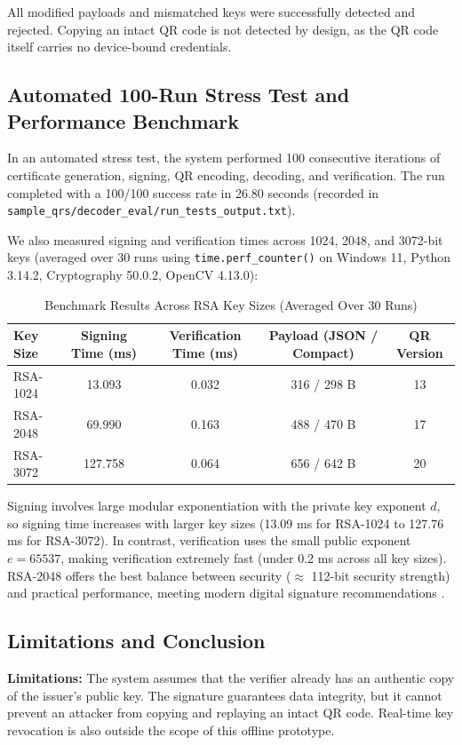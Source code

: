 \documentclass[10pt,a4paper]{article}
\begin{document}
\noindent All modified payloads and mismatched keys were successfully detected and rejected. Copying an intact QR code is not detected by design, as the QR code itself carries no device-bound credentials.

\subsection{Automated 100-Run Stress Test and Performance Benchmark}
In an automated stress test, the system performed 100 consecutive iterations of certificate generation, signing, QR encoding, decoding, and verification. The run completed with a 100/100 success rate in 26.80 seconds (recorded in \texttt{sample\_qrs/decoder\_eval/run\_tests\_output.txt}).

We also measured signing and verification times across 1024, 2048, and 3072-bit keys (averaged over 30 runs using \texttt{time.perf\_counter()} on Windows 11, Python 3.14.2, Cryptography 50.0.2, OpenCV 4.13.0):

\begin{table}[!htbp]
\centering
\caption{Benchmark Results Across RSA Key Sizes (Averaged Over 30 Runs)}
\label{tab:benchmark}
\small
\begin{tabular}{l c c c c}
\toprule
\textbf{Key Size} & \textbf{Signing Time (ms)} & \textbf{Verification Time (ms)} & \textbf{Payload (JSON / Compact)} & \textbf{QR Version} \\
\midrule
RSA-1024 & 13.093 & 0.032 & 316 / 298 B & 13 \\
RSA-2048 & 69.990 & 0.163 & 488 / 470 B & 17 \\
RSA-3072 & 127.758 & 0.064 & 656 / 642 B & 20 \\
\bottomrule
\end{tabular}
\end{table}

\noindent Signing involves large modular exponentiation with the private key exponent $d$, so signing time increases with larger key sizes (13.09 ms for RSA-1024 to 127.76 ms for RSA-3072). In contrast, verification uses the small public exponent $e = 65537$, making verification extremely fast (under 0.2 ms across all key sizes). RSA-2048 offers the best balance between security ($\approx$ 112-bit security strength) and practical performance, meeting modern digital signature recommendations \cite{fips186_5}.

\subsection{Limitations and Conclusion}
\textbf{Limitations:} The system assumes that the verifier already has an authentic copy of the issuer's public key. The signature guarantees data integrity, but it cannot prevent an attacker from copying and replaying an intact QR code. Real-time key revocation is also outside the scope of this offline prototype.
\end{document}
